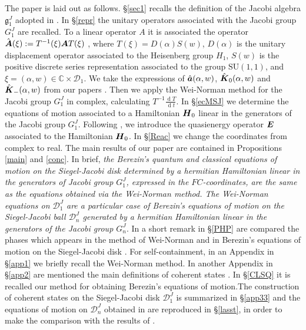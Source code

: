 \documentclass[12pt]{amsart}
\numberwithin{equation}{section}
\theoremstyle{definition}
\begin{document}
The paper is laid out as follows. \S\ref{sec1} recalls  the
definition of the Jacobi algebra ${{\mathfrak{{g}}}}^J_1$ adopted  in \cite{jac1}. In \S\ref{repr} the unitary
operators associated with the Jacobi group $G^J_1$ are recalled.  To a 
linear operator  $A$
it is associated the operator  $\hat{{{\mbox{\boldmath{${A}$}}}}}(\xi):=T^{-1}(\xi)
{{\mbox{\boldmath{${A}$}}}}T(\xi)$ \cite{sbcg,sb12,sb13}, where $T(\xi)=D(\alpha)S(w)$, $D(\alpha)$ is the
unitary displacement operator associated to the Heisenberg group
$H_1$,  $S(w)$ is the positive discrete series representation
associated to the group $\text{SU}(1,1)$, and
$\xi=(\alpha,w)\in{\ensuremath{\mathbb{C}}}\times{{\mathcal{{D}}}}_1$.  We take the expressions of 
$\hat{{{\mbox{\boldmath{${a}$}}}}}(\alpha,w) $,  $ \hat{{{\mbox{\boldmath{${K}$}}}}}_{0}(\alpha,w)$ and
$\hat{{{\mbox{\boldmath{${K}$}}}}}_{-}(\alpha,w)$ from  our papers
\cite{sbcg,sb12,sb13}. Then we apply the Wei-Norman method for the
Jacobi group $G^J_1$ in complex, calculating $T^{-1}\frac{{\operatorname{d}} T}{ {\operatorname{d}}
t}$. In \S\ref{ecMSJ} we determine  the
equations of motion associated to a Hamiltonian  ${{\mbox{\boldmath{${H}$}}}}_0$   linear in the
generators of the Jacobi group $G^J_1$. Following \cite{how}, we
introduce the quasienergy operator ${{\mbox{\boldmath{${E}$}}}}$ associated to the
Hamiltonian ${{\mbox{\boldmath{${H}$}}}}_0$. In \S\ref{Reac} we change the coordinates from
complex to real. The main results of our paper are contained in
Propositions \ref{main} and \ref{conc}. In brief, {\it the Berezin's quantum and classical  equations  of motion on the Siegel-Jacobi disk
  determined by a  hermitian   Hamiltonian linear in the generators of
  Jacobi group  $G^J_1$, expressed in the $FC$-coordinates,  are the same as the equations obtained via the 
  Wei-Norman method. The Wei-Norman equations on ${{\mathcal{{D}}}}^J_1$  are a
particular case of Berezin's equations of motion on the Siegel-Jacobi ball ${{\mathcal{{D}}}}^J_n$
generated by a hermitian Hamiltonian  linear in the generators of the Jacobi group
$G^J_n$}. In a  short remark in \S \ref{PHP} are compared the phases
which appears in the method of Wei-Norman \cite{cezar}  and  in Berezin's equations
of motion on the Siegel-Jacobi disk \cite{nou}. For self-containment, in an Appendix in \S\ref{app1}  we
briefly recall the Wei-Norman method. In another Appendix  in \S\ref{app2} are
mentioned the main definitions of coherent states \cite{perG}. In
\S\ref{CLSQ} it is recalled our method for obtaining Berezin's equations of
motion.The construction of coherent states on the Siegel-Jacobi disk
${{\mathcal{{D}}}}^J_1$ is summarized in \S \ref{app33} and the equations of
motion on ${{\mathcal{{D}}}}^J_n$ obtained in \cite{FC,nou} are reproduced in
\S\ref{lasst}, in 
order to make the comparison with the results of \cite{cezar}.
\enlargethispage{1cm}
\end{document}
